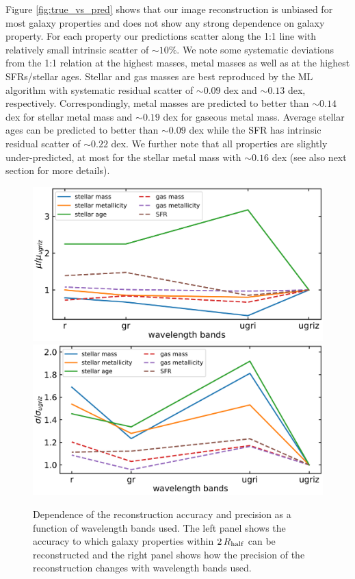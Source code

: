 \documentclass[useAMS,usenatbib]{mnras}
\begin{document}
Figure \ref{fig:true_vs_pred} shows that our image reconstruction is unbiased for most galaxy properties and does not show any strong dependence on galaxy property. For each property our predictions scatter along the 1:1 line with relatively small intrinsic scatter of $\sim 10\%$. We note some systematic deviations from the 1:1 relation at the highest masses, metal masses as well as at the highest SFRs/stellar ages. Stellar and gas masses are best reproduced by the ML algorithm with systematic residual scatter of $\sim0.09$ dex and $\sim0.13$ dex, respectively. Correspondingly, metal masses are predicted to better than $\sim0.14$ dex for stellar metal mass and $\sim0.19$ dex for gaseous metal mass. Average stellar ages can be predicted to better than $\sim0.09$ dex while the SFR has intrinsic residual scatter of $\sim0.22$ dex. We further note that all properties are slightly under-predicted, at most for the stellar metal mass with $\sim0.16$ dex (see also next section for more details).

\begin{figure}
\begin{center}
\includegraphics[width=.485\textwidth]{./plots/band_comparison_mu.pdf}
\includegraphics[width=.5\textwidth]{./plots/band_comparison_sigma.pdf}
\end{center}
\vspace{-.35cm}
\caption{Dependence of the reconstruction accuracy and precision as a function of wavelength bands used. The left panel shows the accuracy to which galaxy properties within $2\,R_{\rm half}$ can be reconstructed and the right panel shows how the precision of the reconstruction changes with wavelength bands used.}
\label{fig:band_comp}
\end{figure}
\end{document}
